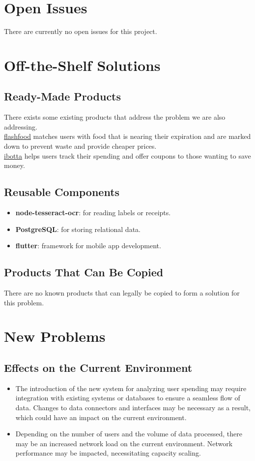 \documentclass[12pt]{article}
\begin{document}
\section{Open Issues}
There are currently no open issues for this project.

\section{Off-the-Shelf Solutions}
\subsection{Ready-Made Products}
There exists some existing products that address the problem we are also addressing. \\

\href{https://www.flashfood.com/}{flashfood} matches users with food that is nearing their expiration and are marked down to prevent waste and provide cheaper prices.\\

\href{https://home.ibotta.com/}{ibotta} helps users track their spending and offer coupons to those wanting to save money.\\

\subsection{Reusable Components}
\begin{itemize}
  \item \textbf{node-tesseract-ocr}: for reading labels or receipts.
  \item \textbf{PostgreSQL}: for storing relational data.
  \item \textbf{flutter}: framework for mobile app development.
\end{itemize}

\subsection{Products That Can Be Copied}
There are no known products that can legally be copied to form a solution for this problem.

\section{New Problems}
\subsection{Effects on the Current Environment}
\begin{itemize}
    \item The introduction of the new system for analyzing user spending may require integration with existing systems or databases to ensure a seamless flow of data. Changes to data connectors and interfaces may be necessary as a result, which could have an impact on the current environment.
    \item Depending on the number of users and the volume of data processed, there may be an increased network load on the current environment. Network performance may be impacted, necessitating capacity scaling.
\end{itemize}
\end{document}
